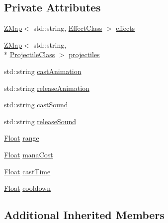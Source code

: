 \subsection*{Private Attributes}
\begin{DoxyCompactItemize}
\item 
\hyperlink{namespaceZeta_a9af2e12c4e432d2a1725f19e5a648a04}{Z\+Map}$<$ std\+::string, \hyperlink{classZeta_1_1EffectClass}{Effect\+Class} $>$ \hyperlink{classZeta_1_1ActiveAbilityClass_a788c0ef48061e2a7e8906c0a93ca3d69}{effects}
\item 
\hyperlink{namespaceZeta_a9af2e12c4e432d2a1725f19e5a648a04}{Z\+Map}$<$ std\+::string, \\*
\hyperlink{classZeta_1_1ProjectileClass}{Projectile\+Class} $>$ \hyperlink{classZeta_1_1ActiveAbilityClass_a113456627f82c54c0f24569817f47867}{projectiles}
\item 
std\+::string \hyperlink{classZeta_1_1ActiveAbilityClass_a0571f13949f9bbdcf09b23ee645fda98}{cast\+Animation}
\item 
std\+::string \hyperlink{classZeta_1_1ActiveAbilityClass_a1cc52858da7286705d8aa755790cddc1}{release\+Animation}
\item 
std\+::string \hyperlink{classZeta_1_1ActiveAbilityClass_af7987f069a6f1f166ba58bb181926752}{cast\+Sound}
\item 
std\+::string \hyperlink{classZeta_1_1ActiveAbilityClass_ad7c34fbf83b75f826243df751de480a0}{release\+Sound}
\item 
\hyperlink{namespaceZeta_a1e0a1265f9b3bd3075fb0fabd39088ba}{Float} \hyperlink{classZeta_1_1ActiveAbilityClass_a592c33c2febef27c1db7eb3c6569f4f6}{range}
\item 
\hyperlink{namespaceZeta_a1e0a1265f9b3bd3075fb0fabd39088ba}{Float} \hyperlink{classZeta_1_1ActiveAbilityClass_aaff991d71ec034fcd902f720d3f5136a}{mana\+Cost}
\item 
\hyperlink{namespaceZeta_a1e0a1265f9b3bd3075fb0fabd39088ba}{Float} \hyperlink{classZeta_1_1ActiveAbilityClass_a7aceb1c38d3a0aa9796903f5d32d750f}{cast\+Time}
\item 
\hyperlink{namespaceZeta_a1e0a1265f9b3bd3075fb0fabd39088ba}{Float} \hyperlink{classZeta_1_1ActiveAbilityClass_a2f97b3b77b0a02adf554af6e59fa81fb}{cooldown}
\end{DoxyCompactItemize}
\subsection*{Additional Inherited Members}


